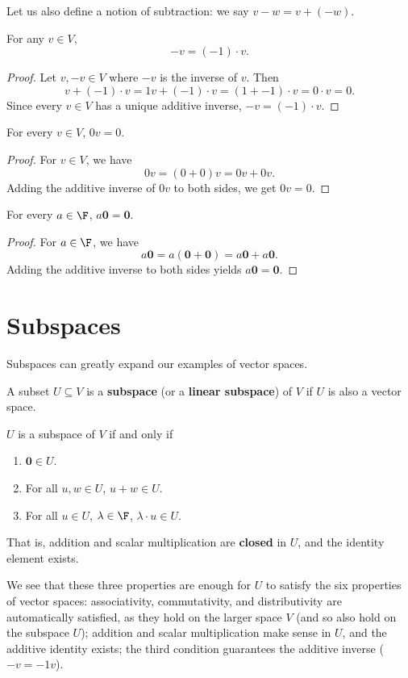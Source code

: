 \documentclass[math0540-lecture-notes.tex]{subfiles}
\begin{document}
Let us also define a notion of subtraction: we say $v-w=v+(-w)$.
\begin{proposition}[-v]{}
  For any $v\in V$, \[
    -v = (-1)\cdot v
  .\] 
\end{proposition}
\begin{proof}[Proof]
  Let $v,-v\in V$ where $-v$ is the inverse of $v$. Then  \[
    v + (-1)\cdot v = 1v + (-1)\cdot v = (1+ -1)\cdot v = 0\cdot v=0
  .\] Since every $v\in V$ has a unique additive inverse, $-v=(-1)\cdot v$.
\end{proof}

\begin{proposition}{}
  For every $v\in V$, $0v=0$.
\end{proposition}
\begin{proof}[Proof]
  For $v\in V$, we have \[
    0v = (0+0)v = 0v + 0v
  .\] Adding the additive inverse of $0v$ to both sides, we get $0v=0$.
\end{proof}

\begin{proposition}{}
  For every $a\in \F$, $a \textbf{0}=\textbf{0}$.
\end{proposition}
\begin{proof}[Proof]
  For $a\in \F$, we have \[
    a \textbf{0} = a(\textbf{0}+\textbf{0})=a \textbf{0}+ a \textbf{0}
  .\] Adding the additive inverse to both sides yields $a \textbf{0}=\textbf{0}$.
\end{proof}




\section{Subspaces}
Subspaces can greatly expand our examples of vector spaces.
\begin{definition}[Subspaces]{}
  A subset $U\subseteq V$ is a \textbf{subspace} (or a \textbf{linear subspace}) of $V$ if $U$ is
  also a vector space.

  $U$ is a subspace of $V$ if and only if
  \begin{enumerate}
    \item $\textbf{0} \in U$.
    \item For all $u,w\in U$, $u+w\in U$.
    \item For all $u\in U$, $\lambda\in \F$, $ \lambda\cdot u\in U$.
  \end{enumerate}
  That is, addition and scalar multiplication are \textbf{closed} in $U$, and the identity element
  exists.

  We see that these three properties are enough for $U$ to satisfy the six properties of vector
  spaces: associativity, commutativity, and distributivity are automatically
  satisfied, as they hold on the larger space $V$ (and so also hold on the subspace $U$); addition
  and scalar multiplication make sense in $U$, and the additive identity exists; the third condition
  guarantees the additive inverse ($-v=-1v$).
\end{definition}
\end{document}
